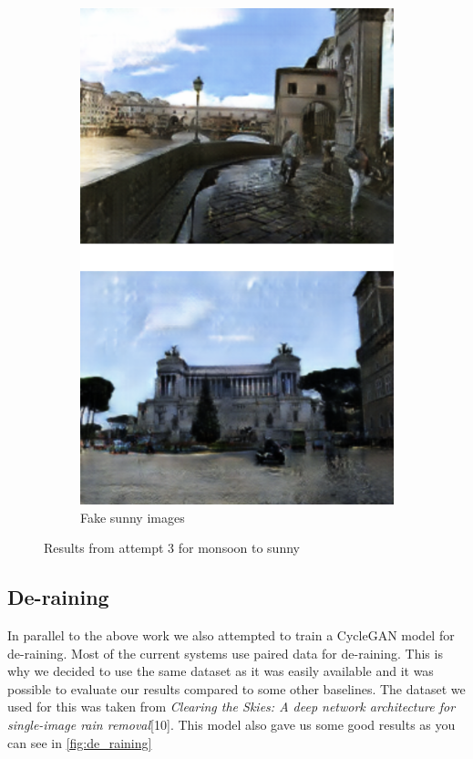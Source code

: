 \documentclass{article}
\begin{document}
\begin{figure}
\begin{subfigure}{.5\textwidth}
		\includegraphics[width=.9\linewidth]{images/v3_fake_A.png}
		\caption{Fake sunny images}
	\end{subfigure}
	\caption{Results from attempt 3 for monsoon to sunny}
	\label{fig:v3_good_BtoA}
\end{figure}

\subsection{De-raining}

In parallel to the above work we also attempted to train a CycleGAN model for de-raining. Most of the current systems use paired data for de-raining. This is why we decided to use the same dataset as it was easily available and it was possible to evaluate our results compared to some other baselines. The dataset we used for this was taken from \textit{Clearing the Skies: A deep network architecture for single-image rain removal}[10]. This model also gave us some good results as 
you can see in \ref{fig:de_raining}
\end{document}

